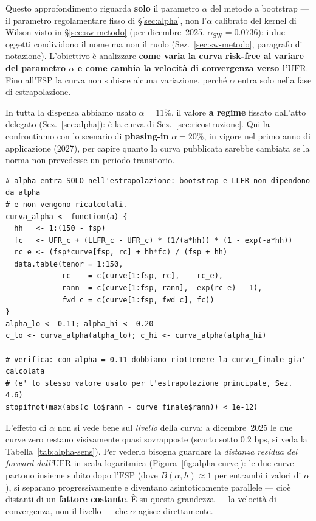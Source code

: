 \documentclass[11pt,a4paper]{article}
\theoremstyle{plain}
\theoremstyle{definition}
\theoremstyle{remark}
\newcommand{\UFR}{\mathrm{UFR}}
\newcommand{\FSP}{\mathrm{FSP}}
\begin{document}
Questo approfondimento riguarda \textbf{solo} il parametro $\alpha$ del metodo a bootstrap
--- il parametro regolamentare fisso di \S\ref{sec:alpha}, non l'$\alpha$ calibrato del
kernel di Wilson visto in \S\ref{sec:sw-metodo} (per dicembre~2025, $\alpha_{\mathrm{SW}}
=0.0736$): i due oggetti condividono il nome ma non il ruolo (Sez.~\ref{sec:sw-metodo},
paragrafo di notazione). L'obiettivo \`e analizzare \textbf{come varia la curva risk-free al
variare del parametro $\alpha$ e come cambia la velocit\`a di convergenza verso l'$\UFR$}.
Fino all'$\FSP$ la curva non subisce alcuna variazione, perch\'e $\alpha$ entra solo nella
fase di estrapolazione.

In tutta la dispensa abbiamo usato $\alpha=11\%$, il valore \textbf{a regime} fissato
dall'atto delegato (Sez.~\ref{sec:alpha}): \`e la curva di Sez.~\ref{sec:ricostruzione}.
Qui la confrontiamo con lo scenario di \textbf{phasing-in} $\alpha=20\%$, in vigore nel primo
anno di applicazione (2027), per capire quanto la curva pubblicata sarebbe cambiata se la
norma non prevedesse un periodo transitorio.

\begin{codebox}
\begin{Verbatim}[fontsize=\small]
# alpha entra SOLO nell'estrapolazione: bootstrap e LLFR non dipendono da alpha
# e non vengono ricalcolati.
curva_alpha <- function(a) {
  hh   <- 1:(150 - fsp)
  fc   <- UFR_c + (LLFR_c - UFR_c) * (1/(a*hh)) * (1 - exp(-a*hh))
  rc_e <- (fsp*curve[fsp, rc] + hh*fc) / (fsp + hh)
  data.table(tenor = 1:150,
             rc    = c(curve[1:fsp, rc],    rc_e),
             rann  = c(curve[1:fsp, rann],  exp(rc_e) - 1),
             fwd_c = c(curve[1:fsp, fwd_c], fc))
}
alpha_lo <- 0.11; alpha_hi <- 0.20
c_lo <- curva_alpha(alpha_lo); c_hi <- curva_alpha(alpha_hi)

# verifica: con alpha = 0.11 dobbiamo riottenere la curva_finale gia' calcolata
# (e' lo stesso valore usato per l'estrapolazione principale, Sez. 4.6)
stopifnot(max(abs(c_lo$rann - curve_finale$rann)) < 1e-12)
\end{Verbatim}
\end{codebox}

L'effetto di $\alpha$ non si vede bene sul \emph{livello} della curva: a dicembre~2025 le due
curve zero restano visivamente quasi sovrapposte (scarto sotto $0.2$ bps, si veda la
Tabella~\ref{tab:alpha-sens}). Per vederlo bisogna guardare la \emph{distanza residua del
forward dall'$\UFR$} in scala logaritmica (Figura~\ref{fig:alpha-curve}): le due curve
partono insieme subito dopo l'$\FSP$ (dove $B(\alpha,h)\approx1$ per entrambi i valori di
$\alpha$), si separano progressivamente e diventano asintoticamente parallele --- cio\`e
distanti di un \textbf{fattore costante}. \`E su questa grandezza --- la velocit\`a di
convergenza, non il livello --- che $\alpha$ agisce direttamente.
\end{document}
